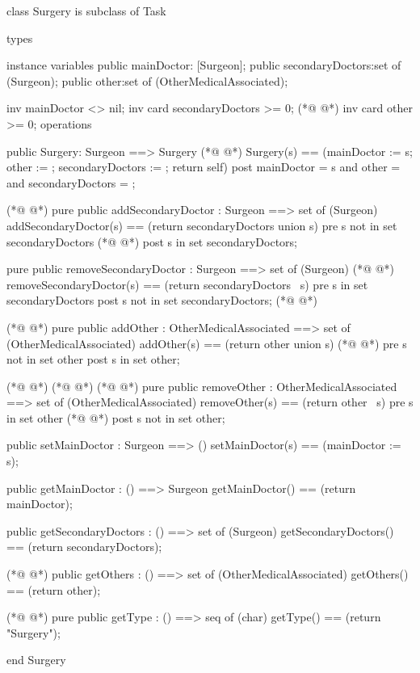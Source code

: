 \begin{vdmpp}[breaklines=true]
class Surgery is subclass of Task

types

instance variables
  public mainDoctor: [Surgeon];
  public secondaryDoctors:set of (Surgeon);
  public other:set of (OtherMedicalAssociated);
  
  inv mainDoctor <> nil;
  inv card secondaryDoctors >= 0;
(*@
\label{Surgery:12}
@*)
  inv card other >= 0;
operations

 public Surgery: Surgeon ==> Surgery
(*@
\label{addSecondaryDoctor:16}
@*)
  Surgery(s) == (mainDoctor := s; other := {}; secondaryDoctors := {}; return self)
 post mainDoctor = s and other = {} and secondaryDoctors = {};
 
(*@
\label{removeSecondaryDoctor:19}
@*)
 pure public addSecondaryDoctor : Surgeon ==> set of (Surgeon)
  addSecondaryDoctor(s) == (return secondaryDoctors union {s})
 pre s not in set secondaryDoctors
(*@
\label{addNurse:22}
@*)
 post s in set secondaryDoctors;
  
 pure public removeSecondaryDoctor : Surgeon ==> set of (Surgeon)
(*@
\label{removeNurse:25}
@*)
  removeSecondaryDoctor(s) == (return secondaryDoctors \ {s})
 pre s in set secondaryDoctors
 post s not in set secondaryDoctors;
(*@
\label{setMainDoctor:28}
@*)
  
(*@
\label{addOther:29}
@*)
 pure public addOther : OtherMedicalAssociated ==> set of (OtherMedicalAssociated)
  addOther(s) == (return other union {s})
(*@
\label{getMainDoctor:31}
@*)
 pre s not in set other
 post s in set other;
  
(*@
\label{getSecondaryDoctor:34}
@*)
(*@
\label{getSecondaryDoctors:34}
@*)
(*@
\label{removeOther:34}
@*)
 pure public removeOther : OtherMedicalAssociated ==> set of (OtherMedicalAssociated)
  removeOther(s) == (return other \ {s})
 pre s in set other
(*@
\label{getNurses:37}
@*)
 post s not in set other;
  
 public setMainDoctor : Surgeon ==> ()
  setMainDoctor(s) == (mainDoctor := s);
  
 public getMainDoctor : () ==> Surgeon
  getMainDoctor() == (return mainDoctor);
  
 public getSecondaryDoctors : () ==> set of (Surgeon)
  getSecondaryDoctors() == (return secondaryDoctors);
  
(*@
\label{getOthers:48}
@*)
 public getOthers : () ==> set of (OtherMedicalAssociated)
  getOthers() == (return other);
  
(*@
\label{getType:51}
@*)
 pure public getType : () ==> seq of (char) 
  getType() == (return "Surgery");

end Surgery
\end{vdmpp}
